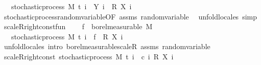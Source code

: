\begin{isabellebody}
\ \ \ {\isachardoublequoteopen}stochastic{\isacharunderscore}{\kern0pt}process\ M\ t\ {\isacharparenleft}{\kern0pt}{\isasymlambda}i\ {\isasymxi}{\isachardot}{\kern0pt}\ {\isacharparenleft}{\kern0pt}Y\ i\ {\isasymxi}{\isacharparenright}{\kern0pt}\ {\isacharasterisk}{\kern0pt}\isactrlsub R\ {\isacharparenleft}{\kern0pt}X\ i\ {\isasymxi}{\isacharparenright}{\kern0pt}{\isacharparenright}{\kern0pt}{\isachardoublequoteclose}\isanewline
%
\isadelimproof
\ \ %
\endisadelimproof
%
\isatagproof
{}\isamarkupfalse%
\ stochastic{\isacharunderscore}{\kern0pt}process{\isachardot}{\kern0pt}random{\isacharunderscore}{\kern0pt}variable{\isacharbrackleft}{\kern0pt}OF\ assms{\isacharbrackright}{\kern0pt}\ random{\isacharunderscore}{\kern0pt}variable\ \isamarkupfalse%
\ {\isacharparenleft}{\kern0pt}unfold{\isacharunderscore}{\kern0pt}locales{\isacharparenright}{\kern0pt}\ simp%
\endisatagproof
{\isafoldproof}%
%
\isadelimproof
\isanewline
%
\endisadelimproof
\isanewline
{}\isamarkupfalse%
\ scaleR{\isacharunderscore}{\kern0pt}right{\isacharunderscore}{\kern0pt}const{\isacharunderscore}{\kern0pt}fun{\isacharcolon}{\kern0pt}\ \isanewline
\ \ \ {\isachardoublequoteopen}f\ {\isasymin}\ borel{\isacharunderscore}{\kern0pt}measurable\ M{\isachardoublequoteclose}\ \isanewline
\ \ \ {\isachardoublequoteopen}stochastic{\isacharunderscore}{\kern0pt}process\ M\ t\ {\isacharparenleft}{\kern0pt}{\isasymlambda}i\ {\isasymxi}{\isachardot}{\kern0pt}\ f\ {\isasymxi}\ {\isacharasterisk}{\kern0pt}\isactrlsub R\ {\isacharparenleft}{\kern0pt}X\ i\ {\isasymxi}{\isacharparenright}{\kern0pt}{\isacharparenright}{\kern0pt}{\isachardoublequoteclose}\ \isanewline
%
\isadelimproof
\ \ %
\endisadelimproof
%
\isatagproof
{}\isamarkupfalse%
\ {\isacharparenleft}{\kern0pt}unfold{\isacharunderscore}{\kern0pt}locales{\isacharparenright}{\kern0pt}\ {\isacharparenleft}{\kern0pt}intro\ borel{\isacharunderscore}{\kern0pt}measurable{\isacharunderscore}{\kern0pt}scaleR\ assms\ random{\isacharunderscore}{\kern0pt}variable{\isacharparenright}{\kern0pt}%
\endisatagproof
{\isafoldproof}%
%
\isadelimproof
\isanewline
%
\endisadelimproof
\isanewline
{}\isamarkupfalse%
\ scaleR{\isacharunderscore}{\kern0pt}right{\isacharunderscore}{\kern0pt}const{\isacharcolon}{\kern0pt}\ {\isachardoublequoteopen}stochastic{\isacharunderscore}{\kern0pt}process\ M\ t\ {\isacharparenleft}{\kern0pt}{\isasymlambda}i\ {\isasymxi}{\isachardot}{\kern0pt}\ c\ i\ {\isacharasterisk}{\kern0pt}\isactrlsub R\ {\isacharparenleft}{\kern0pt}X\ i\ {\isasymxi}{\isacharparenright}{\kern0pt}{\isacharparenright}{\kern0pt}{\isachardoublequoteclose}\isanewline

\end{isabellebody}
